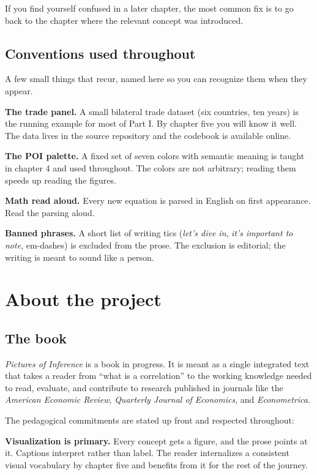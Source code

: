 \documentclass[
  letterpaper,
  11pt,
  twoside,
  openany]{scrbook}
\begin{document}
If you find yourself confused in a later chapter, the most common fix is
to go back to the chapter where the relevant concept was introduced.

\section{Conventions used throughout}\label{conventions-used-throughout}

A few small things that recur, named here so you can recognize them when
they appear.

\textbf{The trade panel.} A small bilateral trade dataset (six
countries, ten years) is the running example for most of Part I. By
chapter five you will know it well. The data lives in the source
repository and the codebook is available online.

\textbf{The POI palette.} A fixed set of seven colors with semantic
meaning is taught in chapter 4 and used throughout. The colors are not
arbitrary; reading them speeds up reading the figures.

\textbf{Math read aloud.} Every new equation is parsed in English on
first appearance. Read the parsing aloud.

\textbf{Banned phrases.} A short list of writing tics (\emph{let's dive
in}, \emph{it's important to note}, em-dashes) is excluded from the
prose. The exclusion is editorial; the writing is meant to sound like a
person.

\chapter{About the project}\label{about-the-project}

\section{The book}\label{the-book}

\emph{Pictures of Inference} is a book in progress. It is meant as a
single integrated text that takes a reader from ``what is a
correlation'' to the working knowledge needed to read, evaluate, and
contribute to research published in journals like the \emph{American
Economic Review}, \emph{Quarterly Journal of Economics}, and
\emph{Econometrica}.

The pedagogical commitments are stated up front and respected
throughout:

\textbf{Visualization is primary.} Every concept gets a figure, and the
prose points at it. Captions interpret rather than label. The reader
internalizes a consistent visual vocabulary by chapter five and benefits
from it for the rest of the journey.
\end{document}
